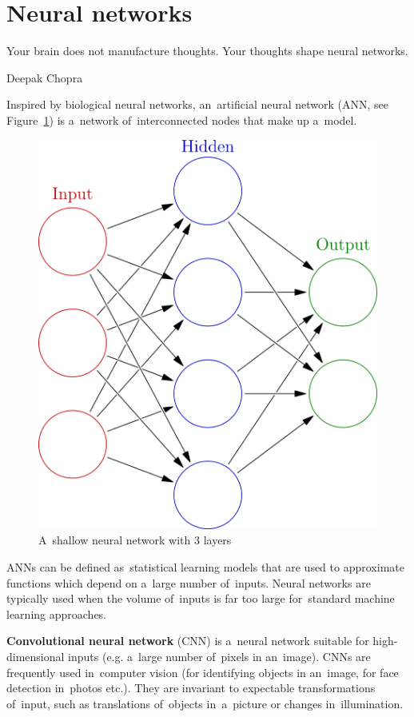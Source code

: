 \section{Neural networks}
\epigraph{
  Your brain does not manufacture thoughts.
  Your thoughts shape neural networks.
}{Deepak Chopra}
Inspired by biological neural networks, an~artificial neural network (ANN, see Figure~\ref{fig:shallow-neural-network}) is a~network of~interconnected nodes that make up a~model.
\begin{figure}[H]
  \centering
  \includegraphics[height=.2\textheight]{../img/colored_neural_network.png}
  \caption{A~shallow neural network with 3 layers}
  \label{fig:shallow-neural-network}
\end{figure}
ANNs can be defined as~statistical learning models that are used to approximate functions which depend on a~large number of~inputs.
Neural networks are typically used when the volume of~inputs is far too large for~standard machine learning approaches.

\textbf{Convolutional neural network} (CNN) is a~neural network suitable for high-dimensional inputs (e.g. a~large number of~pixels in an~image).
CNNs are frequently used in~computer vision (for identifying objects in an~image, for face detection in~photos etc.).
They are invariant to expectable transformations of~input, such as translations of~objects in~a~picture or changes in~illumination.

